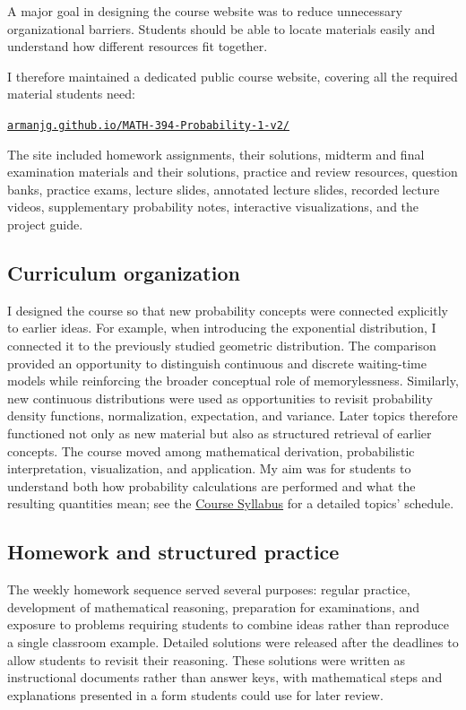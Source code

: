 \documentclass[11pt]{article}
\begin{document}
A major goal in designing the course website was to reduce unnecessary
organizational barriers.
Students should be able to locate materials easily and
understand how different resources fit together.

I therefore maintained a dedicated public course website, covering all the required material students need:

\begin{center}
\href{https://armanjg.github.io/MATH-394-Probability-1-v2/}
{\texttt{armanjg.github.io/MATH-394-Probability-1-v2/}}
\end{center}

The site included homework assignments, their
solutions,
midterm and final examination materials and their solutions,
practice and review resources, question banks, practice exams,
lecture slides, 
annotated lecture slides, recorded lecture videos,
supplementary probability notes,
interactive visualizations,
and the project guide.

\subsection{Curriculum organization}

I designed the course so that new probability concepts were
connected explicitly to earlier ideas. For example,
when introducing the exponential distribution,
I connected it to the previously studied geometric
distribution.
The comparison provided an opportunity to distinguish
continuous and discrete waiting-time models while reinforcing
the broader conceptual role of memorylessness. Similarly,
new continuous distributions were used as opportunities to
revisit probability density functions,
normalization,
expectation,
and variance.
Later topics therefore functioned not only as new material but
also as structured retrieval of earlier concepts. The course moved among mathematical derivation,
probabilistic interpretation,
visualization,
and application.
My aim was for students to understand both how probability
calculations are performed and what the resulting quantities
mean; see the
\hyperref[appendix:math394-syllabus]{Course Syllabus} for a detailed topics' schedule.

\subsection{Homework and structured practice}


The weekly homework sequence served several purposes:
regular practice,
development of mathematical reasoning,
preparation for examinations,
and exposure to problems requiring students to combine ideas
rather than reproduce a single classroom example. Detailed solutions were released after the deadlines to allow students to revisit
their reasoning.
These solutions were written as instructional documents rather
than answer keys,
with mathematical steps and explanations presented in a form
students could use for later review.
\end{document}
